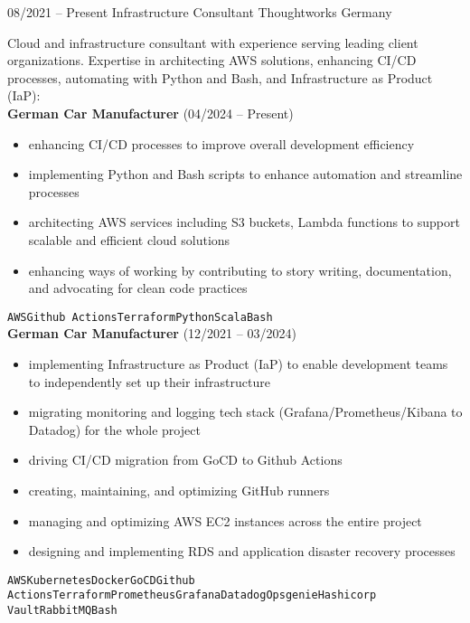 \documentclass[9pt]{developercv} %
\begin{document}
    \begin{entrylist}
    	\entry
    		{08/2021 -- Present}
    		{Infrastructure Consultant}
    		{Thoughtworks Germany}
    		{Cloud and infrastructure consultant with experience serving leading client organizations. Expertise in architecting AWS solutions, enhancing CI/CD processes, automating with Python and Bash, and Infrastructure as Product (IaP):\\

            \textbf{German Car Manufacturer} {\footnotesize(04/2024 -- Present)}
            \begin{itemize}
                \item enhancing CI/CD processes to improve overall development efficiency
                \item implementing Python and Bash scripts to enhance automation and streamline processes
                \item architecting AWS services including S3 buckets, Lambda functions to support scalable and efficient cloud solutions
                \item enhancing ways of working by contributing to story writing, documentation, and advocating for clean code practices

            \end{itemize}
      \texttt{AWS}\slashsep\texttt{Github Actions}\slashsep\texttt{Terraform}\slashsep\texttt{Python}\slashsep\texttt{Scala}\slashsep\texttt{Bash}\\

            \textbf{German Car Manufacturer} {\footnotesize(12/2021 -- 03/2024)}
            \begin{itemize}
                \item implementing Infrastructure as Product (IaP) to enable development teams to independently set up their infrastructure
                \item migrating monitoring and logging tech stack (Grafana/Prometheus/Kibana to Datadog) for the whole project
                \item driving CI/CD migration from GoCD to Github Actions
                \item creating, maintaining, and optimizing GitHub runners
                \item managing and optimizing AWS EC2 instances across the entire project
                \item designing and implementing RDS and application disaster recovery processes
            \end{itemize}
      \texttt{AWS}\slashsep\texttt{Kubernetes}\slashsep\texttt{Docker}\slashsep\texttt{GoCD}\slashsep\texttt{Github Actions}\slashsep\texttt{Terraform}\slashsep\texttt{Prometheus}\slashsep\texttt{Grafana}\slashsep\texttt{Datadog}\slashsep\texttt{Opsgenie}\slashsep\texttt{Hashicorp Vault}\slashsep\texttt{RabbitMQ}\slashsep\texttt{Bash}

}
\end{entrylist}
\end{document}
